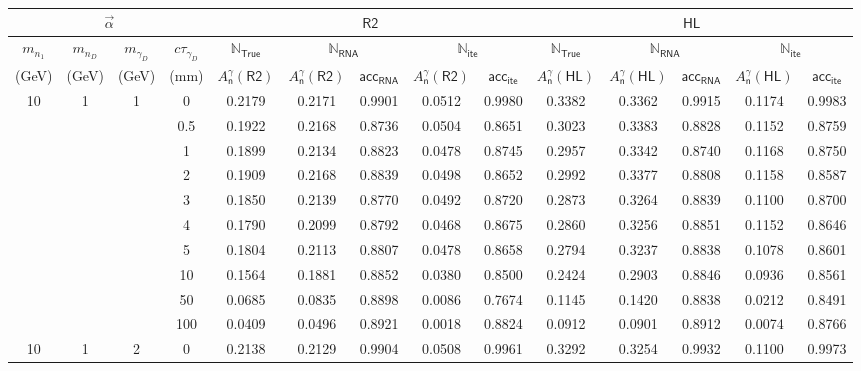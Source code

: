 \begin{landscape}
\begin{table}[!t]
\centering
\footnotesize
\begin{tabular}{|cccc|c|cc|cc|c|cc|cc|}
\toprule
\multicolumn{4}{|c|}{$\vec{\alpha}$} & 
\multicolumn{5}{c}{$\textsf{R2}$} & \multicolumn{5}{c|}{$\textsf{HL}$}\\
\hline
$m_{n_1}$ & $m_{n_D}$ & $m_{\gamma_D}$ & $c\tau_{\gamma_D}$ &
$\mathbb{N}_\textsf{True}$ &
\multicolumn{2}{c}{$\mathbb{N}_\textsf{RNA}$} & 
\multicolumn{2}{|c|}{$\mathbb{N}_\textsf{ite}$} & 
$\mathbb{N}_\textsf{True}$ &
\multicolumn{2}{c}{$\mathbb{N}_\textsf{RNA}$} & 
\multicolumn{2}{|c|}{$\mathbb{N}_\textsf{ite}$}\\
(GeV) & (GeV) & (GeV) & (mm) & 
$A_\textsf{n}^{\gamma} (\textsf{R2})$ & $A_\textsf{n}^{\gamma} (\textsf{R2})$ & $\textsf{acc}_\textsf{RNA}$ & $A_\textsf{n}^{\gamma} (\textsf{R2})$ & $\textsf{acc}_\textsf{ite}$ & 
$A_\textsf{n}^{\gamma} (\textsf{HL})$ & $A_\textsf{n}^{\gamma} (\textsf{HL})$ & $\textsf{acc}_\textsf{RNA}$ & $A_\textsf{n}^{\gamma} (\textsf{HL})$ & $\textsf{acc}_\textsf{ite}$\\
\midrule
10 	& 1 & 1 & 0 	& 0.2179& 0.2171& 0.9901& 0.0512& 0.9980& 0.3382& 0.3362& 0.9915& 0.1174& 0.9983\\
  	&   &   & 0.5 	& 0.1922& 0.2168& 0.8736& 0.0504& 0.8651& 0.3023& 0.3383& 0.8828& 0.1152& 0.8759\\
	& 	& 	& 1		& 0.1899& 0.2134& 0.8823& 0.0478& 0.8745& 0.2957& 0.3342& 0.8740& 0.1168& 0.8750\\
	& 	& 	& 2		& 0.1909& 0.2168& 0.8839& 0.0498& 0.8652& 0.2992& 0.3377& 0.8808& 0.1158& 0.8587\\
	&	&	& 3 	& 0.1850& 0.2139& 0.8770& 0.0492& 0.8720& 0.2873& 0.3264& 0.8839& 0.1100& 0.8700\\
	& 	& 	& 4		& 0.1790& 0.2099& 0.8792& 0.0468& 0.8675& 0.2860& 0.3256& 0.8851& 0.1152& 0.8646\\
	& 	& 	& 5		& 0.1804& 0.2113& 0.8807& 0.0478& 0.8658& 0.2794& 0.3237& 0.8838& 0.1078& 0.8601\\
	&	&	& 10	& 0.1564& 0.1881& 0.8852& 0.0380& 0.8500& 0.2424& 0.2903& 0.8846& 0.0936& 0.8561\\
	&	&	& 50 	& 0.0685& 0.0835& 0.8898& 0.0086& 0.7674& 0.1145& 0.1420& 0.8838& 0.0212& 0.8491\\
	&	&	& 100 	& 0.0409& 0.0496& 0.8921& 0.0018& 0.8824& 0.0912& 0.0901& 0.8912& 0.0074& 0.8766\\
\midrule
10 	& 1 & 2 & 0 	& 0.2138& 0.2129& 0.9904& 0.0508& 0.9961& 0.3292& 0.3254& 0.9932& 0.1100& 0.9973\\

\end{tabular}
\end{table}
\end{landscape}
